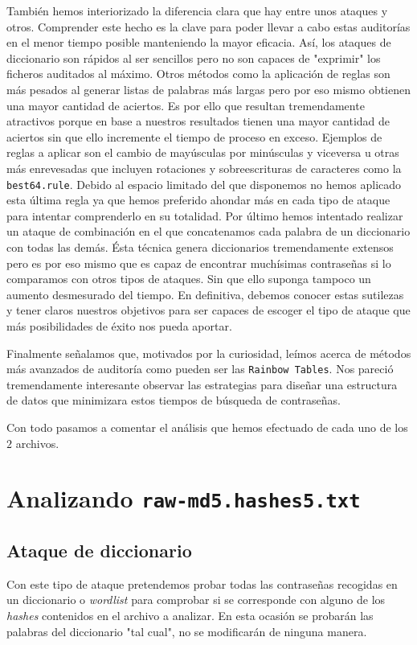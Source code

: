 \documentclass{article}
\begin{document}
        También hemos interiorizado la diferencia clara que hay entre unos ataques y otros. Comprender este hecho es la clave para poder llevar a cabo estas auditorías en el menor tiempo posible manteniendo la mayor eficacia. Así, los ataques de diccionario son rápidos al ser sencillos pero no son capaces de "exprimir" los ficheros auditados al máximo. Otros métodos como la aplicación de reglas son más pesados al generar listas de palabras más largas pero por eso mismo obtienen una mayor cantidad de aciertos. Es por ello que resultan tremendamente atractivos porque en base a nuestros resultados tienen una mayor cantidad de aciertos sin que ello incremente el tiempo de proceso en exceso. Ejemplos de reglas a aplicar son el cambio de mayúsculas por minúsculas y viceversa u otras más enrevesadas que incluyen rotaciones y sobreescrituras de caracteres como la \texttt{best64.rule}. Debido al espacio limitado del que disponemos no hemos aplicado esta última regla ya que hemos preferido ahondar más en cada tipo de ataque para intentar comprenderlo en su totalidad. Por último hemos intentado realizar un ataque de combinación en el que concatenamos cada palabra de un diccionario con todas las demás. Ésta técnica genera diccionarios tremendamente extensos pero es por eso mismo que es capaz de encontrar muchísimas contraseñas si lo comparamos con otros tipos de ataques. Sin que ello suponga tampoco un aumento desmesurado del tiempo. En definitiva, debemos conocer estas sutilezas y tener claros nuestros objetivos para ser capaces de escoger el tipo de ataque que más posibilidades de éxito nos pueda aportar.

        Finalmente señalamos que, motivados por la curiosidad, leímos acerca de métodos más avanzados de auditoría como pueden ser las \texttt{Rainbow Tables}. Nos pareció tremendamente interesante observar las estrategias para diseñar una estructura de datos que minimizara estos tiempos de búsqueda de contraseñas.

        Con todo pasamos a comentar el análisis que hemos efectuado de cada uno de los $2$ archivos.

    \section{Analizando \texttt{raw-md5.hashes5.txt}}
        \subsection{Ataque de diccionario}
            Con este tipo de ataque pretendemos probar todas las contraseñas recogidas en un diccionario o \textit{wordlist} para comprobar si se corresponde con alguno de los \textit{hashes} contenidos en el archivo a analizar. En esta ocasión se probarán las palabras del diccionario "tal cual", no se modificarán de ninguna manera.
\end{document}
